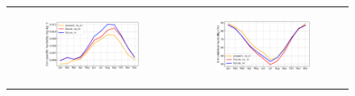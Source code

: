 \begin{figure}[htbp]
\begin{tabular}{cc}
        \begin{subfigure}[b]{0.5\textwidth}
            \caption{}
            \includegraphics[width=\textwidth]{images/chap4/future/SC_q2m_presfutirr.png}
        \end{subfigure} &
        \begin{subfigure}[b]{0.5\textwidth}
            \caption{}
            \includegraphics[width=\textwidth]{images/chap4/future/SC_rh2m_presfutirr.png}
        \end{subfigure} \\


\end{tabular}
\end{figure}
